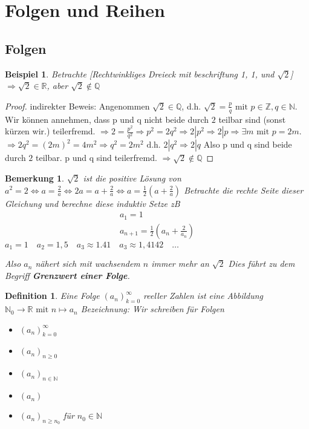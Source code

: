 \documentclass[a4paper,titlepage,oneside]{article}
\def\N{\ensuremath{\mathbb{N}} }
\def\Q{\ensuremath{\mathbb{Q}} }
\def\Z{\ensuremath{\mathbb{Z}} }
\def\R{\ensuremath{\mathbb{R}} }
\def\WSP{\text{Widerspruch.}}
\theoremstyle{thmstyle}
\newtheorem{defi}[satz]{Definition}
\newtheorem{bsp}[satz]{Beispiel}
\newtheorem{bem}[satz]{Bemerkung}
\begin{document}
\section{Folgen und Reihen}
\subsection{Folgen}

\begin{bsp}
Betrachte [Rechtwinkliges Dreieck mit beschriftung 1, 1, und $\sqrt{2}$]
\( \Rightarrow \sqrt{2} \in \R\), aber \(\sqrt{2} \not\in \Q\)
\end{bsp}
\begin{proof}
indirekter Beweis: Angenommen \(\sqrt{2} \in \Q\), d.h. 
$\sqrt{2} = \frac{p}{q}\text{ mit }p \in \Z, q \in \N.$
Wir können annehmen, dass p und q nicht beide durch $2$ teilbar sind (sonst kürzen wir.) teilerfremd.
\(\Rightarrow 2 = \frac{p^2}{q^2} \Rightarrow p^2 = 2q^2 \Rightarrow 2 | p^2 \Rightarrow 2 | p \Rightarrow \exists m \text{ mit } p = 2 m.\)
\( \Rightarrow 2q^2 = (2m)^2 = 4m^2 \Rightarrow q^2 = 2m^2 \text{ d.h. } 2 | q^2  \Rightarrow 2 | q \) Also p und q sind beide durch $2$ teilbar.  \WSP p und q sind teilerfremd. $\Rightarrow \sqrt{2} \not\in \Q$
\end{proof}

\begin{bem}
\( \sqrt{2} \) ist die positive Lösung von \(a^2 = 2 \Leftrightarrow a = \frac{2}{a} \Leftrightarrow  2a = a + \frac{2}{a} \Leftrightarrow a= \frac{1}{2}\left(a + \frac{2}{a}\right)\)
Betrachte die rechte Seite dieser Gleichung und berechne diese induktiv
Setze zB
\begin{align*}
a_1 = 1\\
a_{n+1} = \frac{1}{2}\left(a_n + \frac{2}{a_n}\right)
\end{align*}
\(a_1 = 1 \quad a_2 = 1,5 \quad a_3 \approx 1.41 \quad a_3 \approx 1,4142 \quad \dots \)


Also \(a_n\) nähert sich mit wachsendem \(n\) immer mehr an \(\sqrt{2}\)
Dies führt zu dem Begriff \textbf{Grenzwert einer Folge}.
\end{bem}

\begin{defi}
Eine Folge $(a_n)_{k=0}^{\infty}$ reeller Zahlen ist eine Abbildung $\N_0 \rightarrow \R\text{ mit } n \mapsto a_n$ 
Bezeichnung: Wir schreiben für Folgen
\begin{itemize}
\item $(a_n)_{k=0}^{\infty}$
\item $(a_n)_{n\ge0}$
\item $(a_n)_{n\in\N}$
\item $(a_n)$
\item $(a_n)_{n\ge n_0}$ für $n_0 \in \N$
\end{itemize}
\end{defi}
\end{document}
